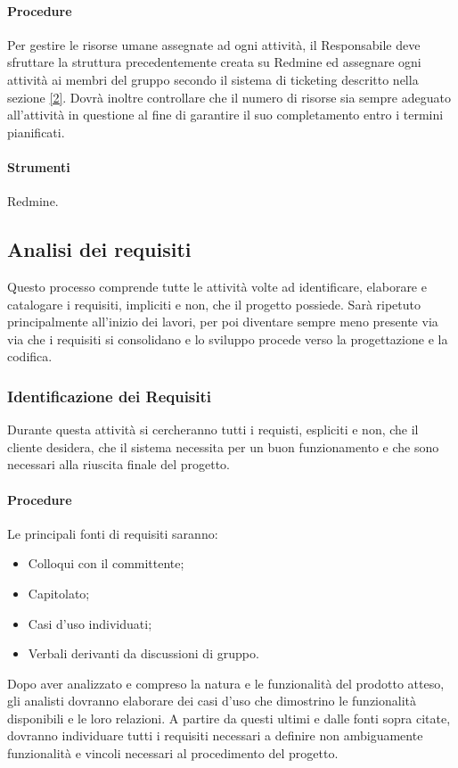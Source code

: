 \paragraph{Procedure}
Per gestire le risorse umane assegnate ad ogni attività, il Responsabile deve sfruttare la struttura precedentemente creata su Redmine ed assegnare ogni attività ai membri del gruppo secondo il sistema di ticketing descritto nella sezione \ref{2}.
Dovrà inoltre controllare che il numero di risorse sia sempre adeguato all'attività in questione al fine di garantire il suo completamento entro i termini pianificati.

\paragraph{Strumenti}
Redmine.

\subsection{Analisi dei requisiti}
Questo processo comprende tutte le attività volte ad identificare, elaborare e catalogare i requisiti, impliciti e non, che il progetto possiede.
Sarà ripetuto principalmente all'inizio dei lavori, per poi diventare sempre meno presente via via che i requisiti si consolidano e lo sviluppo procede verso la progettazione e la codifica.


\subsubsection{Identificazione dei Requisiti}
Durante questa attività si cercheranno tutti i requisti, espliciti e non, che il cliente desidera, che il sistema necessita per un buon funzionamento e che sono necessari alla riuscita finale del progetto.

\paragraph{Procedure}
Le principali fonti di requisiti saranno:
\begin{itemize}
\item Colloqui con il committente;
\item Capitolato;
\item Casi d'uso individuati;
\item Verbali derivanti da discussioni di gruppo.
\end{itemize}
Dopo aver analizzato e compreso la natura e le funzionalità del prodotto atteso, gli analisti dovranno elaborare dei casi d'uso che dimostrino le funzionalità disponibili e le loro relazioni.
A partire da questi ultimi e dalle fonti sopra citate, dovranno individuare tutti i requisiti necessari a definire non ambiguamente funzionalità e vincoli necessari al procedimento del progetto.


